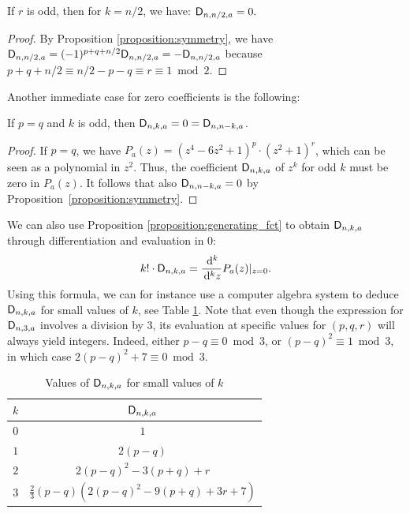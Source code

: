 \documentclass[11pt]{llncs}
\begin{document}
\begin{Corollary}
	If $r$ is odd, then for $k=n/2$, we have: $\mathsf{D}_{n,n/2,a}=0.$
\end{Corollary}

\begin{proof}
	By Proposition \ref{proposition:symmetry}, we have $\mathsf{D}_{n,n/2,a}=(-1)^{p+q+n/2}\mathsf{D}_{n,n/2,a}=-\mathsf{D}_{n,n/2,a}$ because $p+q+n/2\equiv n/2-p-q\equiv r\equiv 1\bmod 2$.
\end{proof}

Another immediate case for zero coefficients is the following:


\begin{proposition}
    If $p=q$ and $k$ is odd, then $\mathsf{D}_{n,k,a}=0=\mathsf{D}_{n,n-k,a}$.
\end{proposition}

\begin{proof}
    If $p=q$, we have $P_a(z)=(z^4-6z^2+1)^p\cdot(z^2+1)^r$, which can be seen as a polynomial in $z^2$. Thus, the coefficient $\mathsf{D}_{n,k,a}$ of $z^k$ for odd $k$ must be zero in $P_a(z)$. It follows that also $\mathsf{D}_{n,n-k,a}=0$ by Proposition~\ref{proposition:symmetry}.
\end{proof}





\begin{remark}\label{remark:D_nka_differentiation}
    We can also use Proposition \ref{proposition:generating_fct} to obtain $\mathsf{D}_{n,k,a}$ through differentiation and evaluation in $0$:
    \[
        k!\cdot\mathsf{D}_{n,k,a}=\frac{\,\mathrm d^k}{\,\mathrm d^k z}P_a(z)\vert_{z=0}.
    \]
    Using this formula, we can for instance use a computer algebra system to deduce $\mathsf{D}_{n,k,a}$ for small values of $k$, see Table \ref{tab:Dnka_small_k}. Note that even though the expression for $\mathsf{D}_{n,3,a}$ involves a division by $3$, its evaluation at specific values for $(p,q,r)$ will always yield integers. Indeed, either $p-q\equiv 0\bmod 3$, or $(p-q)^2\equiv 1\bmod 3$, in which case $2(p-q)^2+7\equiv 0\bmod 3$.
    
    \begin{table}
    	\centering
    	\begin{tabular}{|c|c|}
    		\hline
    		$k$ & $\mathsf{D}_{n,k,a}$\\ \hline
    		$0$&$1$\\ \hline
            $1$&$2(p-q)$\\ \hline
            $2$&$2(p-q)^2-3(p+q)+r$\\ \hline
            $3$&$\frac 23(p-q)\left(2(p-q)^2-9(p+q)+3r+7\right)$\\ \hline
    	\end{tabular}
    	\caption{Values of $\mathsf{D}_{n,k,a}$ for small values of $k$}\label{tab:Dnka_small_k}
    \end{table}
\end{remark}
\end{document}
